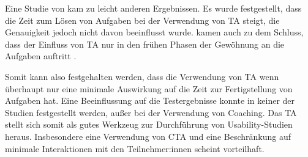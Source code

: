 Eine Studie von \textcite{rheniusEvaluationConcurrent1990} kam zu leicht anderen Ergebnissen. Es wurde festgestellt, dass die Zeit zum Lösen von Aufgaben bei der Verwendung von \ac{TA} steigt, die Genauigkeit jedoch nicht davon beeinflusst wurde. \citeauthor{rheniusEvaluationConcurrent1990} kamen auch zu dem Schluss, dass der Einfluss von \ac{TA} nur in den frühen Phasen der Gewöhnung an die Aufgaben auftritt \parencite{rheniusEvaluationConcurrent1990}.

Somit kann also festgehalten werden, dass die Verwendung von \ac{TA} wenn überhaupt nur eine minimale Auswirkung auf die Zeit zur Fertigstellung von Aufgaben hat. Eine Beeinflussung auf die Testergebnisse konnte in keiner der Studien festgestellt werden, außer bei der Verwendung von Coaching. Das \ac{TA} stellt sich somit als gutes Werkzeug zur Durchführung von Usability-Studien heraus. Insbesondere eine Verwendung von \ac{CTA} und eine Beschränkung auf minimale Interaktionen mit den Teilnehmer:innen scheint vorteilhaft.
